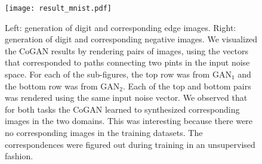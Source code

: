 \documentclass{article}
\begin{document}
\begin{figure}[tbh!]
\centering
\texttt{[image: result\_mnist.pdf]}
\caption{Left: generation of digit and corresponding edge images. Right: generation of digit and corresponding negative images. We visualized the CoGAN results by rendering pairs of images, using the vectors that corresponded to paths connecting two pints in the input noise space. For each of the sub-figures, the top row was from $\text{GAN}_1$ and the bottom row was from $\text{GAN}_2$. Each of the top and bottom pairs was rendered using the same input noise vector. We observed that for both tasks the CoGAN learned to synthesized corresponding images in the two domains. This was interesting because there were no corresponding images in the training datasets. The correspondences were figured out during training in an unsupervised fashion.}
\label{fig::result_mnist_edge_vis}
\end{figure}
\end{document}
